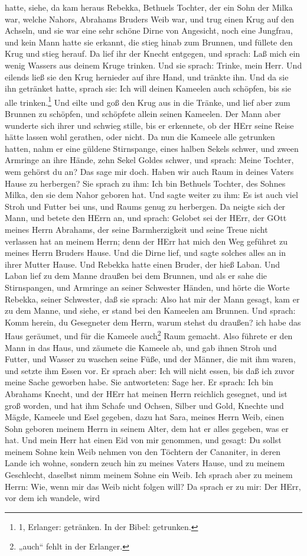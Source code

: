 \begin{schriftzitat}
hatte, siehe, da kam heraus Rebekka, Bethuels Tochter, der ein Sohn der Milka war, welche Nahors, Abrahams Bruders Weib war, und trug einen Krug auf den Achseln, und sie war eine sehr schöne Dirne von Angesicht, noch eine Jungfrau, und kein Mann hatte sie erkannt, die stieg hinab zum Brunnen, und füllete den Krug und stieg herauf. Da lief ihr der Knecht entgegen, und sprach: Laß mich ein wenig Wassers aus deinem Kruge trinken. Und sie sprach: Trinke, mein Herr. Und eilends ließ sie den Krug hernieder auf ihre Hand, und tränkte ihn. Und da sie ihn getränket hatte, sprach sie: Ich will deinen Kameelen auch schöpfen, bis sie alle trinken.\footnote{1, Erlanger: getränken. In der Bibel: getrunken.} Und eilte und goß den Krug aus in die Tränke, und lief aber zum Brunnen zu schöpfen, und schöpfete allein seinen Kameelen. Der Mann aber wunderte sich ihrer und schwieg stille, bis er erkennete, ob der HErr seine Reise hätte lassen wohl gerathen, oder nicht. Da nun die Kameele alle getrunken hatten, nahm er eine güldene Stirnspange, eines halben Sekels schwer, und zween Armringe an ihre Hände, zehn Sekel Goldes schwer, und sprach: Meine Tochter, wem gehörst du an? Das sage mir doch. Haben wir auch Raum in deines Vaters Hause zu herbergen? Sie sprach zu ihm: Ich bin Bethuels Tochter, des Sohnes Milka, den sie dem Nahor geboren hat. Und sagte weiter zu ihm: Es ist auch viel Stroh und Futter bei uns, und Raums genug zu herbergen. Da neigte sich der Mann, und betete den HErrn an, und sprach: Gelobet sei der HErr, der GOtt meines Herrn Abrahams, der seine Barmherzigkeit und seine Treue nicht verlassen hat an meinem Herrn; denn der HErr hat mich den Weg geführet zu meines Herrn Bruders Hause. Und die Dirne lief, und sagte solches alles an in ihrer Mutter Hause. Und Rebekka hatte einen Bruder, der hieß Laban. Und Laban lief zu dem Manne draußen bei dem Brunnen, und als er sahe die Stirnspangen, und Armringe an seiner Schwester Händen, und hörte die Worte Rebekka, seiner Schwester, daß sie sprach: Also hat mir der Mann gesagt, kam er zu dem Manne, und siehe, er stand bei den Kameelen am Brunnen. Und sprach: Komm herein, du Gesegneter dem Herrn, warum stehst du draußen? ich habe das Haus geräumet, und für die Kameele auch\footnote{„auch“ fehlt in der Erlanger.} Raum gemacht. Also führete er den Mann in das Haus, und zäumete die Kameele ab, und gab ihnen Stroh und Futter, und Wasser zu waschen seine Füße, und der Männer, die mit ihm waren, und setzte ihm Essen vor. Er sprach aber: Ich will nicht essen, bis daß ich zuvor meine Sache geworben habe. Sie antworteten: Sage her. Er sprach: Ich bin Abrahams Knecht, und der HErr hat meinen Herrn reichlich gesegnet, und ist groß worden, und hat ihm Schafe und Ochsen, Silber und Gold, Knechte und Mägde, Kameele und Esel gegeben, dazu hat Sara, meines Herrn Weib, einen Sohn geboren meinem Herrn in seinem Alter, dem hat er alles gegeben, was er hat. Und mein Herr hat einen Eid von mir genommen, und gesagt: Du sollst meinem Sohne kein Weib nehmen von den Töchtern der Cananiter, in deren Lande ich wohne, sondern zeuch hin zu meines Vaters Hause, und zu meinem Geschlecht, daselbst nimm meinem Sohne ein Weib. Ich sprach aber zu meinem Herrn: Wie, wenn mir das Weib nicht folgen will? Da sprach er zu mir: Der HErr, vor dem ich wandele, wird 
\end{schriftzitat}

